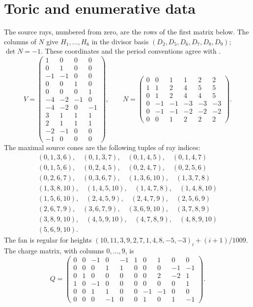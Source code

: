 \section{Toric and enumerative data}\label{app:data}

The source rays, numbered from zero, are the rows of the first matrix
below. The columns of $N$ give $H_1,\ldots,H_6$ in the divisor basis
$(D_2,D_5,D_6,D_7,D_8,D_9)$; $\det N=-1$. These coordinates and
the period conventions agree with \cite[Appendix A]{WuebbenHiggs}.
\[
 V=\begin{pmatrix}
1&0&0&0\\
0&1&0&0\\
-1&-1&0&0\\
0&0&1&0\\
0&0&0&1\\
-4&-2&-1&0\\
-4&-2&0&-1\\
3&1&1&1\\
2&1&1&1\\
-2&-1&0&0\\
-1&0&0&0
\end{pmatrix},\qquad N=\begin{pmatrix}
0&0&1&1&2&2\\
1&1&2&4&5&5\\
0&1&2&4&4&5\\
0&-1&-1&-3&-3&-3\\
0&-1&-1&-2&-2&-2\\
0&0&1&2&2&2
\end{pmatrix}.
\]
The maximal source cones are the following tuples of ray indices:\[\begin{gathered}
(0,1,3,6),\quad (0,1,3,7),\quad (0,1,4,5),\quad (0,1,4,7)\\
(0,1,5,6),\quad (0,2,4,5),\quad (0,2,4,7),\quad (0,2,5,6)\\
(0,2,6,7),\quad (0,3,6,7),\quad (1,3,6,10),\quad (1,3,7,8)\\
(1,3,8,10),\quad (1,4,5,10),\quad (1,4,7,8),\quad (1,4,8,10)\\
(1,5,6,10),\quad (2,4,5,9),\quad (2,4,7,9),\quad (2,5,6,9)\\
(2,6,7,9),\quad (3,6,7,9),\quad (3,6,9,10),\quad (3,7,8,9)\\
(3,8,9,10),\quad (4,5,9,10),\quad (4,7,8,9),\quad (4,8,9,10)\\
(5,6,9,10).
\end{gathered}\]
The fan is regular for heights
$(10,11,3,9,2,7,1,4,8,-5,-3)_i+(i+1)/1009$.
The charge matrix, with columns $0,\ldots,9$, is
\[Q=\begin{pmatrix}
0&0&-1&0&-1&1&0&1&0&0\\
0&0&0&1&1&0&0&0&-1&-1\\
0&1&0&0&0&0&0&2&-2&1\\
1&0&-1&0&0&0&0&0&0&1\\
0&0&1&1&0&0&-1&-1&0&0\\
0&0&0&-1&0&0&1&0&1&-1
\end{pmatrix}.\]

